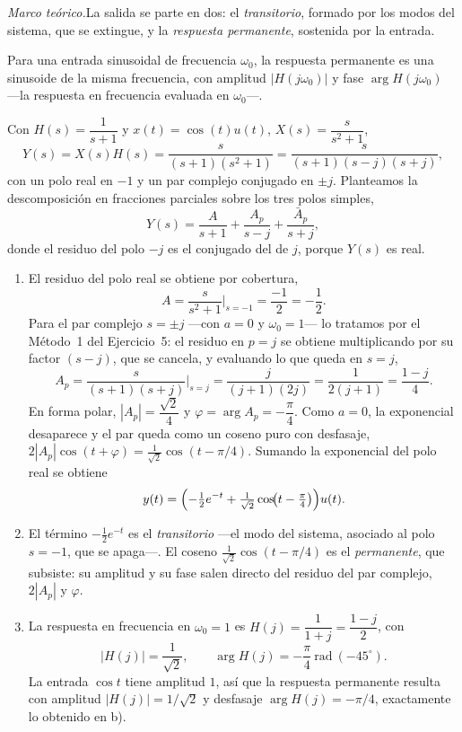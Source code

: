 \documentclass[10pt,a4paper]{article}
\newcommand{\teoria}[1]{\noindent\textit{Marco teórico.}\enspace #1\par\smallskip}
\begin{document}
\teoria{La salida se parte en dos: el \emph{transitorio}, formado por los modos
del sistema, que se extingue, y la \emph{respuesta permanente}, sostenida por la entrada.

Para una entrada sinusoidal de frecuencia $\omega_0$, la respuesta permanente es una
sinusoide de la misma frecuencia, con amplitud $|H(j\omega_0)|$ y fase
$\arg H(j\omega_0)$ ---la respuesta en frecuencia evaluada en $\omega_0$---.}

Con $H(s)=\dfrac{1}{s+1}$ y $x(t)=\cos(t)u(t)$, $X(s)=\dfrac{s}{s^2+1}$,
\[
	Y(s)=X(s)H(s)=\frac{s}{(s+1)(s^2+1)}=\frac{s}{(s+1)(s-j)(s+j)},
\]
con un polo real en $-1$ y un par complejo conjugado en $\pm j$. Planteamos
la descomposición en fracciones parciales sobre los tres polos simples,
\[
	Y(s)=\frac{A}{s+1}+\frac{A_p}{s-j}+\frac{\bar A_p}{s+j},
\]
donde el residuo del polo $-j$ es el conjugado del de $j$, porque $Y(s)$
es real.

\begin{enumerate}
	\item El residuo del polo real se obtiene por cobertura,
	\[
		A=\frac{s}{s^2+1}\bigg|_{s=-1}=\frac{-1}{2}=-\frac12.
	\]
	Para el par complejo $s=\pm j$ ---con $a=0$ y $\omega_0=1$--- lo tratamos
	por el Método~1 del Ejercicio~5: el residuo en $p=j$ se obtiene
	multiplicando por su factor $(s-j)$, que se cancela, y evaluando lo que
	queda en $s=j$,
	\[
		A_p=\frac{s}{(s+1)(s+j)}\bigg|_{s=j}=\frac{j}{(j+1)(2j)}=\frac{1}{2(j+1)}=\frac{1-j}{4}.
	\]
	En forma polar, $|A_p|=\dfrac{\sqrt2}{4}$ y $\varphi=\arg A_p=-\dfrac{\pi}{4}$.
	Como $a=0$, la exponencial desaparece y el par queda como un coseno puro
	con desfasaje, $2|A_p|\cos(t+\varphi)=\tfrac{1}{\sqrt2}\cos(t-\pi/4)$.
	Sumando la exponencial del polo real se obtiene
	\[
		y(t)=\Bigl(-\tfrac12 e^{-t}+\tfrac{1}{\sqrt2}\cos\!\bigl(t-\tfrac{\pi}{4}\bigr)\Bigr)u(t).
	\]

	\item El término $-\tfrac12 e^{-t}$ es el \emph{transitorio} ---el modo
	del sistema, asociado al polo $s=-1$, que se apaga---. El coseno
	$\tfrac{1}{\sqrt2}\cos(t-\pi/4)$ es el \emph{permanente}, que subsiste:
	su amplitud y su fase salen directo del residuo del par complejo,
	$2|A_p|$ y $\varphi$.

	\item La respuesta en frecuencia en $\omega_0=1$ es
	$H(j)=\dfrac{1}{1+j}=\dfrac{1-j}{2}$, con
	\[
		|H(j)|=\frac{1}{\sqrt2},
		\qquad
		\arg H(j)=-\frac{\pi}{4}\ \text{rad}\ (-45^\circ).
	\]
	La entrada $\cos t$ tiene amplitud $1$, así que la respuesta permanente resulta con
	amplitud $|H(j)|=1/\sqrt2$ y desfasaje $\arg H(j)=-\pi/4$, exactamente lo
	obtenido en b).
\end{enumerate}
\end{document}
